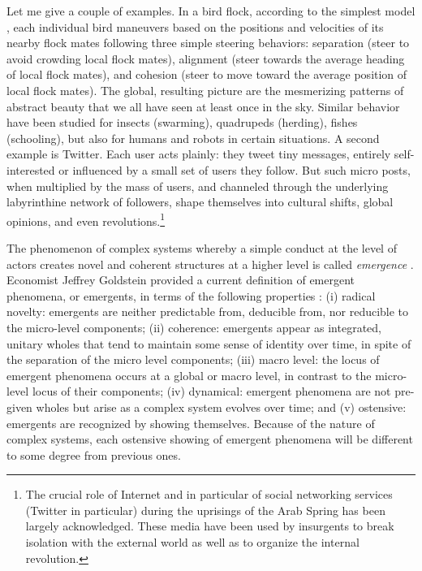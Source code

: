 \documentclass{article}
\begin{document}
Let me give a couple of examples. In a bird flock, according to the simplest model \cite{R87},  each individual bird maneuvers based on the positions and velocities of its nearby flock mates following three simple steering behaviors: separation (steer to avoid crowding local flock mates), alignment (steer towards the average heading of local flock mates), and cohesion (steer to move toward the average position of local flock mates).  The global, resulting picture are the mesmerizing patterns of abstract beauty that we all have seen at least once in the sky. Similar behavior have been studied for insects (swarming), quadrupeds (herding), fishes (schooling), but also for humans and robots in certain situations.  A second example is Twitter. Each user acts plainly: they tweet tiny messages, entirely self-interested or influenced by a small set of users they follow. But such micro posts, when multiplied by the mass of users, and channeled through the underlying labyrinthine network of followers, shape themselves into cultural shifts, global opinions, and even revolutions.\footnote{The crucial role of Internet and in particular of social networking services (Twitter in particular) during the uprisings of the Arab Spring has been largely acknowledged. These media have been used by insurgents to break isolation with the external world as well as to organize the internal revolution.} 

The phenomenon of complex systems whereby a simple conduct at the level of actors creates novel and coherent structures at a higher level is called \textit{emergence} \cite{H99}. Economist Jeffrey Goldstein provided a current definition of emergent phenomena, or emergents, in terms of the following properties \cite{G99}: (i) radical novelty: emergents are neither predictable from, deducible from, nor reducible to the micro-level components; (ii) coherence: emergents appear as integrated, unitary wholes that tend to maintain some sense of identity over time, in spite of the separation of the micro level components; (iii) macro level: the locus of emergent phenomena occurs at a global or macro level, in contrast to the micro-level locus of their components; (iv) dynamical: emergent phenomena are not pre-given wholes but arise as a complex system evolves over time; and (v) ostensive: emergents are recognized by showing themselves. Because of the nature of complex systems, each ostensive showing of emergent phenomena will be different to some degree from previous ones.  
\end{document}

